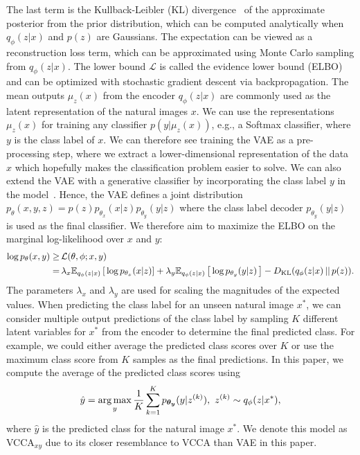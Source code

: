 The last term is the Kullback-Leibler (KL) divergence~ of the approximate posterior from the prior distribution, which can be computed analytically when $q_{\phi}(z|x)$ and $p(z)$ are Gaussians. The expectation can be viewed as a reconstruction loss term, which can be approximated using Monte Carlo sampling from $q_{\phi}(z|x)$. The lower bound $\mathcal{L}$ is called the evidence lower bound (ELBO) and can be optimized with stochastic gradient descent via backpropagation. The mean outputs $\mu_{z}(x)$ from the encoder $q_{\phi}(z|x)$ are commonly used as the latent representation of the natural images $x$. We can use the representations
$\mu_{z}(x)$ for training any classifier $p(y | \mu_{z}(x))$, e.g., a Softmax classifier, where $y$ is the class label of $x$. We can therefore see training the VAE as a pre-processing step, where we extract a lower-dimensional representation of the data $x$ which hopefully makes the classification problem easier to solve. 
We can also extend the VAE with a generative classifier by incorporating the class label $y$ in the model~. 
Hence, the VAE defines a joint distribution $p_{\theta}(x, y, z) = p(z) p_{\theta_{x}}(x|z) p_{\theta_{y}}(y|z)$ where the class label decoder $p_{\theta_{y}}(y|z)$ is used as the final classifier. 
We therefore aim to maximize the ELBO on the marginal log-likelihood over $x$ and $y$: 
\begin{align}\label{eq:loss_vcca_xy}
    \begin{split}
        \log p_{\theta}(x, y) \geq & \, \mathcal{L}(\theta, \phi; x, y) \\ 
        = & \,  \lambda_{x} \mathbb{E}_{q_{\phi}(z|x)}\left[\, \log p_{\theta_{x}}(x | z) \right] + \lambda_{y} \mathbb{E}_{q_{\phi}(z|x)}\left[\, \log p_{\theta_{y}}(y | z) \,\right] - D_{\mathrm{KL}}(q_{\phi}(z|x)\,||\,p(z)) .
    \end{split}
\end{align}  
The parameters $\lambda_{x}$ and $\lambda_{y}$ are used for scaling the magnitudes of the expected values. When predicting the class label for an unseen natural image $x^{*}$, we can consider multiple output predictions of the class label by sampling $K$ different latent variables for $x^{*}$ from the encoder to determine the final predicted class. For example, we could either average the predicted class scores over $K$ or use the maximum class score from $K$ samples as the final predictions. In this paper, we compute the average of the predicted class scores using
\begin{align}\label{eq:prediction_vcca_xy}
    \hat{y} = \operatorname*{arg\,max}_{y} \frac{1}{K} \sum_{k=1}^{K} p_{\bm{\theta_{y}}}(y | z^{(k)}), \,\, z^{(k)} \sim q_{\phi}(z | x^{*}) ,
\end{align}
where $\hat{y}$ is the predicted class for the natural image $x^{*}$. We denote this model as VCCA$_{x y}$ due to its closer resemblance to VCCA than VAE in this paper.


